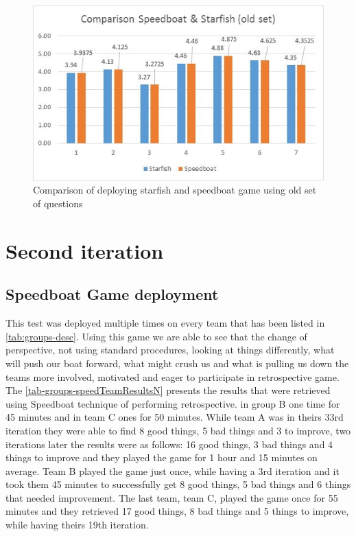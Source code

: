 \begin{figure}[!htbp]
\caption{Comparison of deploying starfish and speedboat game using old set of questions}
\label{fig:comparedResultsOld}
\centering
\includegraphics[width=1\textwidth]{charts/comparisonOldSet}
\end{figure}
\section{Second iteration}
\label{sec:secondIt}
\subsection{Speedboat Game deployment}

This test was deployed multiple times on every team that has been listed in \autoref{tab:groups-desc}. Using this game we are able to see that the change of perspective, not using standard procedures, looking at things differently, what will push our boat forward, what might crush us and what is pulling us down the teams more involved, motivated and eager to participate in retrospective game. The \autoref{tab-groups-speedTeamResultsN} presents the results that were retrieved using Speedboat technique of performing retrospective.  in group B one time for 45 minutes and in team C ones for 50 minutes. While team A was in theirs 33rd iteration they were able to find 8 good things, 5 bad things and 3 to improve, two iterations later the results were as follows: 16 good things, 3 bad things and 4 things to improve and they played the game for 1 hour and 15 minutes on average. Team B played the game just once, while having a 3rd iteration and it took them 45 minutes to successfully get 8 good things, 5 bad things and 6 things that needed improvement. The last team, team C, played the game once for 55 minutes and they retrieved 17 good things, 8 bad things and 5 things to improve, while having theirs 19th iteration.

